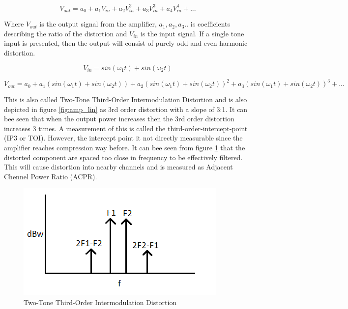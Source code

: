 \begin{equation} \label{eq:dest}
V_{out} = a_0 + a_1 V_{in} + a_2 V_{in}^2 + a_3 V_{in}^3 + a_4 V_{in}^4 + ... 
\end{equation}

Where $V_{out}$ is the output signal from the amplifier, $a_1, a_2 ,a_3..$ is coefficients describing the ratio of the distortion and $V_{in}$ is the input signal. If a single tone input is presented, then the output will consist of purely odd and even harmonic distortion. 

\begin{equation}\label{eq:dest1}
V_{in} = sin(\omega_1 t) + sin(\omega_2 t)
\end{equation} 

\begin{equation} \label{eq:dest2}
V_{out} = a_0 + a_1 (sin(\omega_1 t) + sin(\omega_2 t)) + a_2 (sin(\omega_1 t) + sin(\omega_2 t))^2 + a_3 (sin(\omega_1 t) + sin(\omega_2 t))^3 + ... 
\end{equation}

This is also called Two-Tone Third-Order Intermodulation Distortion and is also depicted in figure \ref{fig:amp_lin} as 3rd order distortion with a slope of 3:1. It can bee seen that when the output power increases then the 3rd order distortion increases 3 times. A measurement of this is called the third-order-intercept-point (IP3 or TOI). However, the intercept point it not directly measurable since the amplifier reaches compression way before. It can bee seen from figure \ref{fig:amp_psd} that the distorted component are spaced too close in frequency to be effectively filtered. This will cause distortion into nearby channels and is measured as Adjacent Chennel Power Ratio (ACPR).

\begin{figure}[H]
\centering 
\includegraphics[scale = 0.7]{figures/ch1/amp_psd.png}
\caption{Two-Tone Third-Order Intermodulation Distortion}
\label{fig:amp_psd}
\end{figure}

